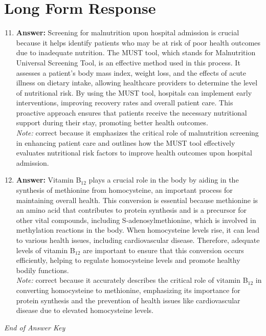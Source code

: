 \documentclass[12pt]{article}
\begin{document}
\section*{Long Form Response}
\begin{enumerate}[label=\arabic*.]
\setcounter{enumi}{10}
\item \textbf{Answer:} Screening for malnutrition upon hospital admission is crucial because it helps identify patients who may be at risk of poor health outcomes due to inadequate nutrition. The MUST tool, which stands for Malnutrition Universal Screening Tool, is an effective method used in this process. It assesses a patient's body mass index, weight loss, and the effects of acute illness on dietary intake, allowing healthcare providers to determine the level of nutritional risk. By using the MUST tool, hospitals can implement early interventions, improving recovery rates and overall patient care. This proactive approach ensures that patients receive the necessary nutritional support during their stay, promoting better health outcomes.
\\ \textit{Note:} correct because it emphasizes the critical role of malnutrition screening in enhancing patient care and outlines how the MUST tool effectively evaluates nutritional risk factors to improve health outcomes upon hospital admission.
\item \textbf{Answer:} Vitamin B$_{12}$ plays a crucial role in the body by aiding in the synthesis of methionine from homocysteine, an important process for maintaining overall health. This conversion is essential because methionine is an amino acid that contributes to protein synthesis and is a precursor for other vital compounds, including S-adenosylmethionine, which is involved in methylation reactions in the body. When homocysteine levels rise, it can lead to various health issues, including cardiovascular disease. Therefore, adequate levels of vitamin B$_{12}$ are important to ensure that this conversion occurs efficiently, helping to regulate homocysteine levels and promote healthy bodily functions.
\\ \textit{Note:} correct because it accurately describes the critical role of vitamin B$_{12}$ in converting homocysteine to methionine, emphasizing its importance for protein synthesis and the prevention of health issues like cardiovascular disease due to elevated homocysteine levels.
\end{enumerate}

\vfill
\noindent\textit{End of Answer Key}
\end{document}
